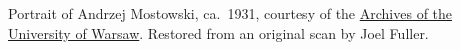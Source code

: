 Portrait of Andrzej Mostowski, ca.~1931, courtesy of the
\href{http://www.archiwum.uw.edu.pl/}{Archives of the University
of Warsaw}.  Restored from an original scan by Joel Fuller.

